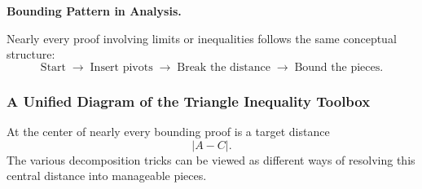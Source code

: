 \begin{tcolorbox}[colback=gray!6,colframe=gray!40,arc=2pt]
\textbf{Bounding Pattern in Analysis.}

Nearly every proof involving limits or inequalities follows the same
conceptual structure:
\[
\text{Start}
\;\longrightarrow\;
\text{Insert pivots}
\;\longrightarrow\;
\text{Break the distance}
\;\longrightarrow\;
\text{Bound the pieces}.
\]
\end{tcolorbox}

\subsubsection*{A Unified Diagram of the Triangle Inequality Toolbox}

At the center of nearly every bounding proof is a target distance
\[
|A-C|.
\]
The various decomposition tricks can be viewed as different ways of
resolving this central distance into manageable pieces.

